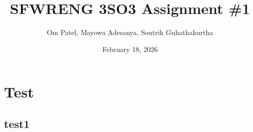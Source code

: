 \documentclass{article}
\begin{document}
\title{SFWRENG 3SO3 Assignment \#1}
\author{Om Patel, Mayowa Adesanya, Soutrik Guhathakurtha}
\date{February 18, 2026}
\maketitle
\newpage
\tableofcontents

\newpage

\section{Test}

\subsection{test1}
\end{document}
